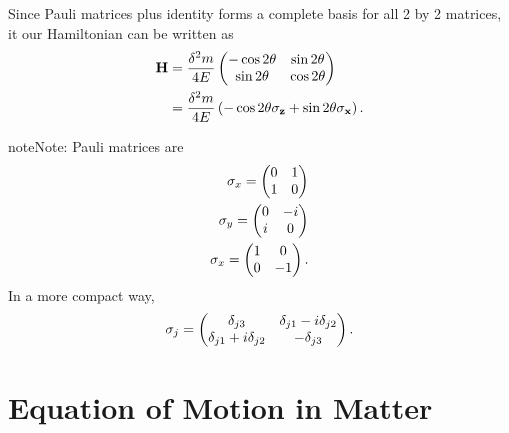 \documentclass[letterpaper,12pt,english]{sphinxmanual}
\begin{document}
Since Pauli matrices plus identity forms a complete basis for all 2 by 2 matrices, it our Hamiltonian can be written as
\begin{gather}
\begin{split}\mathbf H  &= \frac{\delta^2 m}{4E}\begin{pmatrix} -\cos 2\theta & \sin 2\theta \\ \sin 2\theta & \cos 2\theta \end{pmatrix} \\
& = \frac{\delta^2 m}{4 E} \left( -\cos 2\theta \mathbf{\sigma_z} + \sin 2\theta \mathbf{\sigma_x} \right).\end{split}\notag
\end{gather}
\begin{notice}{note}{Note:}
Pauli matrices are
\begin{gather}
\begin{split}\sigma_x = \begin{pmatrix}0 & 1 \\ 1 & 0\end{pmatrix} \\
\sigma_y = \begin{pmatrix}0 & -i \\ i & 0\end{pmatrix} \\
\sigma_x = \begin{pmatrix}1 & 0 \\ 0 & -1\end{pmatrix}.\end{split}\notag
\end{gather}
In a more compact way,
\begin{gather}
\begin{split}\sigma_j = \begin{pmatrix} \delta_{j3}&\delta_{j1}-i\delta_{j2}\\ \delta_{j1}+i\delta_{j2}&-\delta_{j3}\end{pmatrix}  .\end{split}\notag
\end{gather}\end{notice}


\section{Equation of Motion in Matter}
\label{oscillations:equation-of-motion-in-matter}
\end{document}
